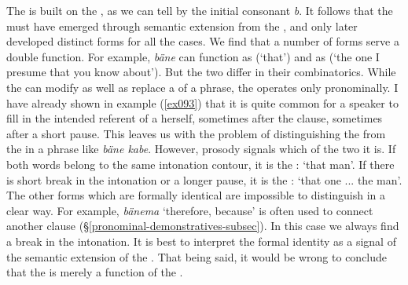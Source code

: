 The   is built on the  , as we can tell by the initial consonant \emph{b}. It follows that the  must have emerged through semantic extension from the  , and only later developed distinct forms for all the cases. We find that a number of forms serve a double function. For example, \emph{bäne} can function as   (`that') and as   (`the one I presume that you know about'). But the two differ in their combinatorics. While the  can modify as well as replace a   of a phrase, the  operates only pronominally. I have already shown in example (\ref{ex093}) that it is quite common for a speaker to fill in the intended referent of a  herself, sometimes after the clause, sometimes after a short pause. This leaves us with the problem of distinguishing the   from the  in a phrase like \emph{bäne kabe}. However, prosody signals which of the two it is. If both words belong to the same intonation contour, it is the  : `that man'. If there is short break in the intonation or a longer pause, it is the : `that one ... the man'. The other  forms which are formally identical are impossible to distinguish in a clear way. For example, \emph{bänema} `therefore, because' is often used to connect another clause ({\S}\ref{pronominal-demonstratives-subsec}). In this case we always find a break in the intonation. It is best to interpret the formal identity as a signal of the semantic extension of the  . That being said, it would be wrong to conclude that the  is merely a function of the  .

